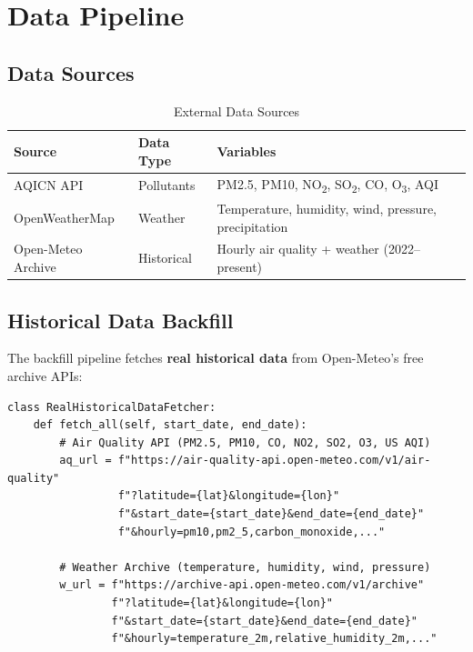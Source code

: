 \documentclass[12pt, a4paper, oneside]{article}
\begin{document}
\section{Data Pipeline}

\subsection{Data Sources}

\begin{table}[H]
\centering
\caption{External Data Sources}
\label{tab:datasources}
\begin{tabularx}{\textwidth}{l l X}
\toprule
\textbf{Source} & \textbf{Data Type} & \textbf{Variables} \\
\midrule
AQICN API & Pollutants & PM2.5, PM10, NO\textsubscript{2}, SO\textsubscript{2}, CO, O\textsubscript{3}, AQI \\
OpenWeatherMap & Weather & Temperature, humidity, wind, pressure, precipitation \\
Open-Meteo Archive & Historical & Hourly air quality + weather (2022--present) \\
\bottomrule
\end{tabularx}
\end{table}

\subsection{Historical Data Backfill}

The backfill pipeline fetches \textbf{real historical data} from Open-Meteo's free archive APIs:

\begin{lstlisting}[caption={Historical data fetching from Open-Meteo APIs}]
class RealHistoricalDataFetcher:
    def fetch_all(self, start_date, end_date):
        # Air Quality API (PM2.5, PM10, CO, NO2, SO2, O3, US AQI)
        aq_url = f"https://air-quality-api.open-meteo.com/v1/air-quality"
                 f"?latitude={lat}&longitude={lon}"
                 f"&start_date={start_date}&end_date={end_date}"
                 f"&hourly=pm10,pm2_5,carbon_monoxide,..."
        
        # Weather Archive (temperature, humidity, wind, pressure)
        w_url = f"https://archive-api.open-meteo.com/v1/archive"
                f"?latitude={lat}&longitude={lon}"
                f"&start_date={start_date}&end_date={end_date}"
                f"&hourly=temperature_2m,relative_humidity_2m,..."
\end{lstlisting}
\end{document}
